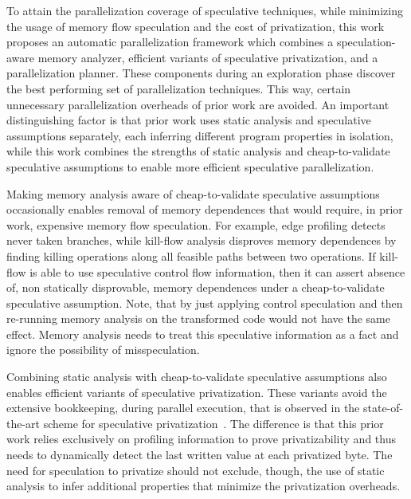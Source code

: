 To attain the parallelization coverage of speculative techniques,
while minimizing the usage of memory flow speculation and the cost of
privatization,
%
this work proposes an automatic parallelization framework which
combines a speculation-aware memory analyzer, efficient variants of
speculative privatization, and a parallelization planner. These
components during an exploration phase discover the best performing
set of parallelization techniques. This way, certain unnecessary
parallelization overheads of prior work are avoided.
%
An important distinguishing factor is that prior work uses static
analysis and speculative assumptions separately, each inferring
different program properties in isolation, while this work combines
the strengths of static analysis and cheap-to-validate speculative
assumptions to enable more efficient speculative parallelization.

Making memory analysis aware of cheap-to-validate speculative
assumptions occasionally enables removal of memory dependences that
would require, in prior work, expensive memory flow speculation.
%
For example, edge profiling detects never taken branches, while
kill-flow analysis disproves memory dependences by finding killing
operations along all feasible paths between two operations. If
kill-flow is able to use speculative control flow information, then it
can assert absence of, non statically disprovable, memory dependences
under a cheap-to-validate speculative assumption.
Note, that by just applying control speculation and then re-running
memory analysis on the transformed code would not have the same
effect.  Memory analysis needs to treat this speculative information
as a fact and ignore the possibility of misspeculation.

Combining static analysis with cheap-to-validate speculative
assumptions also enables efficient variants of speculative
privatization.
%
These variants avoid the extensive bookkeeping, during parallel
execution, that is observed in the state-of-the-art scheme for
speculative privatization~\cite{johnson:12:pldi}.
%
The difference is that this prior work relies exclusively on profiling
information to prove privatizability and thus needs to dynamically
detect the last written value at each privatized byte.
%
The need for speculation to privatize should not exclude, though, the
use of static analysis to infer additional properties that minimize
the privatization overheads.

